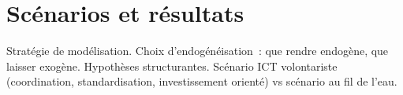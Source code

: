 \chapter{Scénarios et résultats}\label{ch:scenarios}

Stratégie de modélisation. Choix d'endogénéisation~: que rendre endogène, que laisser exogène. Hypothèses structurantes. Scénario ICT volontariste (coordination, standardisation, investissement orienté) vs scénario au fil de l'eau.
